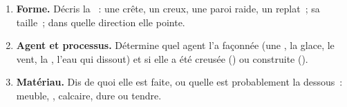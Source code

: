\begin{method}
\begin{enumerate}
  \item \textbf{Forme.} Décris la ~: une crête, un creux,
        une paroi raide, un replat~; sa taille~; dans quelle direction elle
        pointe.
  \item \textbf{Agent et processus.} Détermine quel agent l'a façonnée (une
        , la glace, le vent, la , l'eau qui dissout) et si elle a
        été creusée () ou construite ().
  \item \textbf{Matériau.} Dis de quoi elle est faite, ou quelle est
        probablement la  dessous~:  meuble, , calcaire,
         dure ou tendre.
\end{enumerate}
\end{method}

